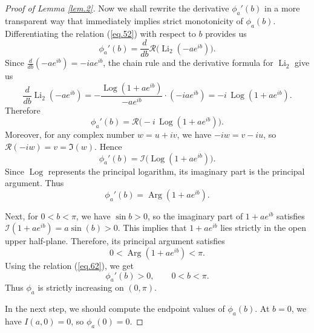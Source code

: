 \documentclass[preprint,12pt,nopreprintline]{elsarticle}
\begin{document}
\begin{proof}[Proof of Lemma \ref{lem.2}]
Now we shall rewrite the derivative \(\phi_a'(b)\) in a more transparent way that immediately implies strict monotonicity of \(\phi_a(b)\). Differentiating the relation (\ref{eq.52}) with respect to \(b\) provides us
\begin{equation}
\phi_a'(b)
=
\frac{d}{db}\mathscr{R}\!\bigl(\operatorname{Li}_2(-ae^{ib})\bigr).
\end{equation}
Since \(\frac{d}{db}(-ae^{ib})=-iae^{ib}\), the chain rule and the derivative formula for \(\operatorname{Li}_2\) give us
\begin{equation}
\frac{d}{db}\operatorname{Li}_2(-ae^{ib})
=
-\frac{\operatorname{Log}(1+ae^{ib})}{-ae^{ib}}\cdot (-iae^{ib})
=
-i\,\operatorname{Log}(1+ae^{ib}).
\end{equation}
Therefore
\begin{equation}
\phi_a'(b)
=
\mathscr{R}\!\bigl(-i\,\operatorname{Log}(1+ae^{ib})\bigr).
\end{equation}
Moreover, for any complex number \(w=u+iv\), we have \(-iw=v-iu\), so \(\mathscr{R}(-iw)=v=\Im(w)\). Hence
\begin{equation}
\phi_a'(b)
=
\mathscr{I}\!\bigl(\operatorname{Log}(1+ae^{ib})\bigr).
\end{equation}
Since \(\operatorname{Log}\) represents the principal logarithm, its imaginary part is the principal argument. Thus
\begin{equation}\label{eq.62}
\phi_a'(b)=\operatorname{Arg}(1+ae^{ib}).
\end{equation}

Next, for \(0<b<\pi\), we have \(\sin b>0\), so the imaginary part of \(1+ae^{ib}\) satisfies \(\mathscr{I}(1+ae^{ib})=a\sin \left(b\right)>0\). This implies that \(1+ae^{ib}\) lies strictly in the open upper half-plane. Therefore, its principal
argument satisfies
\begin{equation}
0<\operatorname{Arg}(1+ae^{ib})<\pi.
\end{equation}
Using the relation (\ref{eq.62}), we get
\begin{equation}
\phi_a'(b)>0,
\qquad 0<b<\pi.
\end{equation}
Thus \(\phi_a\) is strictly increasing on \((0,\pi)\).

In the next step, we should compute the endpoint values of \(\phi_a\left(b\right)\). At \(b=0\), we have \(I(a,0)=0\), so \(\phi_a(0)=0\).


\end{proof}
\end{document}
